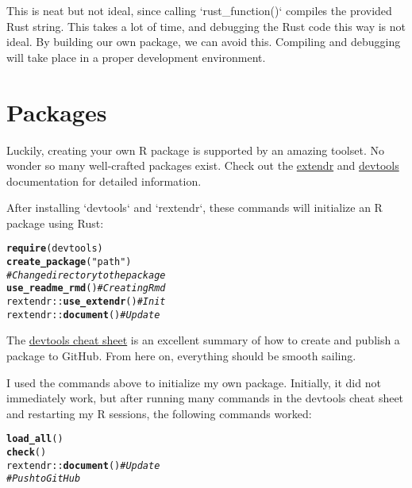 \documentclass[twoside,twocolumn]{article}\usepackage[]{graphicx}\usepackage[dvipsnames]{xcolor}
\makeatletter
\newcommand{\hlstr}[1]{\textcolor[rgb]{0.192,0.494,0.8}{#1}}%
\newcommand{\hlcom}[1]{\textcolor[rgb]{0.678,0.584,0.686}{\textit{#1}}}%
\newcommand{\hlopt}[1]{\textcolor[rgb]{0,0,0}{#1}}%
\newcommand{\hlstd}[1]{\textcolor[rgb]{0.345,0.345,0.345}{#1}}%
\newcommand{\hlkwd}[1]{\textcolor[rgb]{0.737,0.353,0.396}{\textbf{#1}}}%
\newenvironment{kframe}{%
 \def\at@end@of@kframe{}%
 \ifinner\ifhmode%
  \def\at@end@of@kframe{\end{minipage}}%
  \begin{minipage}{\columnwidth}%
 \fi\fi%
 \def\FrameCommand##1{\hskip\@totalleftmargin \hskip-\fboxsep
 \colorbox{shadecolor}{##1}\hskip-\fboxsep
     \hskip-\linewidth \hskip-\@totalleftmargin \hskip\columnwidth}%
 \MakeFramed {\advance\hsize-\width
   \@totalleftmargin\z@ \linewidth\hsize
   \@setminipage}}%
 {\par\unskip\endMakeFramed%
 \at@end@of@kframe}
\newenvironment{knitrout}{}{} %
\makeatother
\begin{document}
This is neat but not ideal, since calling `rust\_function()` compiles the provided Rust string. This takes a lot of time, and debugging the Rust code this way is not ideal. By building our own package, we can avoid this. Compiling and debugging will take place in a proper development environment.

\section*{Packages}
Luckily, creating your own R package is supported by an amazing toolset. No wonder so many well-crafted packages exist. Check out the \href{https://extendr.github.io/rextendr/articles/package.html}{extendr} and \href{https://rstudio.github.io/cheatsheets/html/package-development.html}{devtools} documentation for detailed information. 

After installing `devtools` and `rextendr`, these commands will initialize an R package using Rust:
\begin{knitrout}
\color{fgcolor}\begin{kframe}
\begin{alltt}
\hlkwd{require}\hlstd{(devtools)}
\hlkwd{create_package}\hlstd{(}\hlstr{"path"}\hlstd{)}
\hlcom{# Change directory to the package}
\hlkwd{use_readme_rmd}\hlstd{()} \hlcom{# Creating Rmd}
\hlstd{rextendr}\hlopt{::}\hlkwd{use_extendr}\hlstd{()} \hlcom{# Init}
\hlstd{rextendr}\hlopt{::}\hlkwd{document}\hlstd{()} \hlcom{# Update}
\end{alltt}
\end{kframe}
\end{knitrout}
The \href{https://rstudio.github.io/cheatsheets/package-development.pdf}{devtools cheat sheet} is an excellent summary of how to create and publish a package to GitHub. From here on, everything should be smooth sailing.

I used the commands above to initialize my own package. Initially, it did not immediately work, but after running many commands in the devtools cheat sheet and restarting my R sessions, the following commands worked:
\begin{knitrout}
\color{fgcolor}\begin{kframe}
\begin{alltt}
\hlkwd{load_all}\hlstd{()}
\hlkwd{check}\hlstd{()}
\hlstd{rextendr}\hlopt{::}\hlkwd{document}\hlstd{()} \hlcom{# Update}
\hlcom{# Push to GitHub}
\end{alltt}
\end{kframe}
\end{knitrout}
\end{document}
